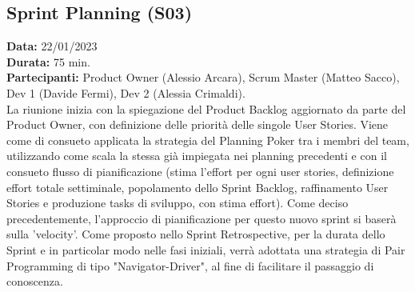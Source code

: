 \documentclass[a4paper, oneside]{article}
\newcommand\tre{Scrum Master (Matteo Sacco), Dev 1 (Davide Fermi), Dev 2 (Alessia Crimaldi).}
\newcommand\treP{Product Owner (Alessio Arcara), }
\begin{document}
\begin{landscape}
        \subsection{Sprint Planning (S03)}
        \textbf{Data:} 22/01/2023\\
        \textbf{Durata:} 75 min.\\
        \textbf{Partecipanti:} \treP \tre \\
        \newline La riunione inizia con la spiegazione del Product Backlog aggiornato da parte del Product Owner, con definizione delle priorità delle singole User Stories. Viene come di consueto applicata la strategia del Planning Poker tra i membri del team, utilizzando come scala la stessa già impiegata nei planning precedenti e con il consueto flusso di pianificazione (stima l'effort per ogni user stories, definizione effort totale settiminale, popolamento dello Sprint Backlog, raffinamento User Stories e produzione tasks di sviluppo, con stima effort). Come deciso precedentemente, l'approccio di pianificazione per questo nuovo sprint si baserà sulla 'velocity'.
        \newline Come proposto nello Sprint Retrospective, per la durata dello Sprint e in particolar modo nelle fasi iniziali, verrà adottata una strategia di Pair Programming di tipo "Navigator-Driver", al fine di facilitare il passaggio di conoscenza.

        \newpage

\end{landscape}
\end{document}
